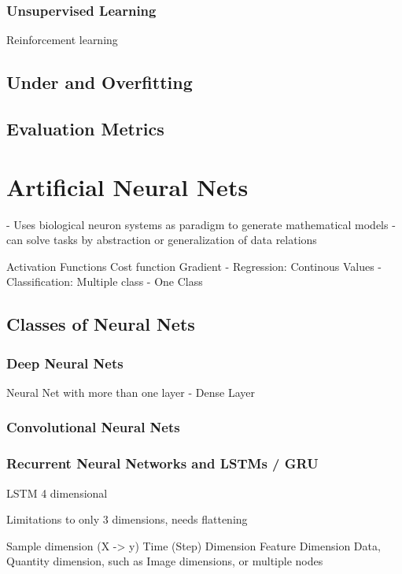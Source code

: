 \subsubsection{Unsupervised Learning}
Reinforcement learning
\subsection{Under and Overfitting}
\subsection{Evaluation Metrics}
\section{Artificial Neural Nets}

- Uses biological neuron systems as paradigm to generate mathematical models
- can solve tasks by abstraction or generalization of data relations


Activation Functions
Cost function
Gradient
- Regression: Continous Values
- Classification: Multiple class
- One Class

\subsection{Classes of Neural Nets}

\subsubsection{Deep Neural Nets}

Neural Net with more than one layer
- Dense Layer

\subsubsection{Convolutional Neural Nets}
\subsubsection{Recurrent Neural Networks and LSTMs / GRU}
LSTM 4 dimensional

Limitations to only 3 dimensions, needs flattening

Sample dimension (X -> y)
Time (Step) Dimension
Feature Dimension
Data, Quantity dimension, such as Image dimensions, or multiple nodes

